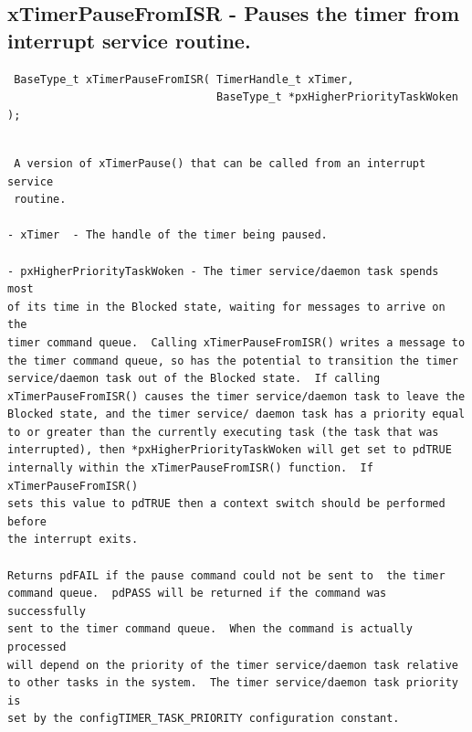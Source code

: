 \subsection{xTimerPauseFromISR -  Pauses the timer from interrupt service routine.}
\label{rt_cmd:xTimerPauseFromISR}
\begin{verbatim}
 BaseType_t xTimerPauseFromISR( TimerHandle_t xTimer,
                                BaseType_t *pxHigherPriorityTaskWoken );
\end{verbatim}

\begin{lstlisting}

 A version of xTimerPause() that can be called from an interrupt service
 routine.

- xTimer  - The handle of the timer being paused.

- pxHigherPriorityTaskWoken - The timer service/daemon task spends most
of its time in the Blocked state, waiting for messages to arrive on the
timer command queue.  Calling xTimerPauseFromISR() writes a message to
the timer command queue, so has the potential to transition the timer
service/daemon task out of the Blocked state.  If calling
xTimerPauseFromISR() causes the timer service/daemon task to leave the
Blocked state, and the timer service/ daemon task has a priority equal
to or greater than the currently executing task (the task that was
interrupted), then *pxHigherPriorityTaskWoken will get set to pdTRUE
internally within the xTimerPauseFromISR() function.  If xTimerPauseFromISR()
sets this value to pdTRUE then a context switch should be performed before
the interrupt exits.

Returns pdFAIL if the pause command could not be sent to  the timer
command queue.  pdPASS will be returned if the command was successfully
sent to the timer command queue.  When the command is actually processed
will depend on the priority of the timer service/daemon task relative
to other tasks in the system.  The timer service/daemon task priority is
set by the configTIMER_TASK_PRIORITY configuration constant.

\end{lstlisting}
